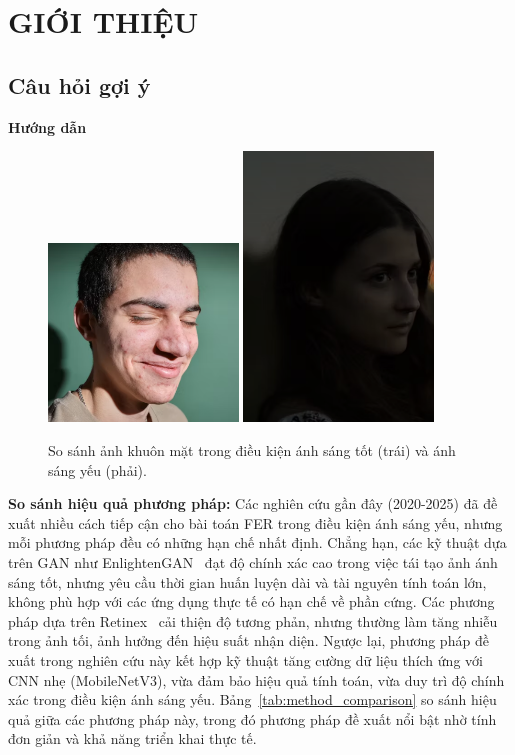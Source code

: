 \section*{GIỚI THIỆU}
\subsection*{Câu hỏi gợi ý}
\textbf{Hướng dẫn} \\
\begin{figure}[h]
    \centering
    \includegraphics[width=0.45\textwidth]{light_image.png} 
    \includegraphics[width=0.45\textwidth]{dark_image.png}
    \caption{So sánh ảnh khuôn mặt trong điều kiện ánh sáng tốt (trái) và ánh sáng yếu (phải).}
    \label{fig:light_vs_dark}
\end{figure}
\textbf{So sánh hiệu quả phương pháp:} Các nghiên cứu gần đây (2020-2025) đã đề xuất nhiều cách tiếp cận cho bài toán FER trong điều kiện ánh sáng yếu, nhưng mỗi phương pháp đều có những hạn chế nhất định. Chẳng hạn, các kỹ thuật dựa trên GAN như EnlightenGAN~\cite{jiang2021enlightengan} đạt độ chính xác cao trong việc tái tạo ảnh ánh sáng tốt, nhưng yêu cầu thời gian huấn luyện dài và tài nguyên tính toán lớn, không phù hợp với các ứng dụng thực tế có hạn chế về phần cứng. Các phương pháp dựa trên Retinex~\cite{zhang2022retinex} cải thiện độ tương phản, nhưng thường làm tăng nhiễu trong ảnh tối, ảnh hưởng đến hiệu suất nhận diện. Ngược lại, phương pháp đề xuất trong nghiên cứu này kết hợp kỹ thuật tăng cường dữ liệu thích ứng với CNN nhẹ (MobileNetV3), vừa đảm bảo hiệu quả tính toán, vừa duy trì độ chính xác trong điều kiện ánh sáng yếu. Bảng~\ref{tab:method_comparison} so sánh hiệu quả giữa các phương pháp này, trong đó phương pháp đề xuất nổi bật nhờ tính đơn giản và khả năng triển khai thực tế.

